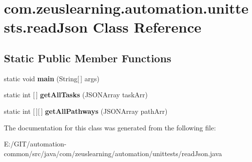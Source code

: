 \hypertarget{classcom_1_1zeuslearning_1_1automation_1_1unittests_1_1readJson}{}\section{com.\+zeuslearning.\+automation.\+unittests.\+read\+Json Class Reference}
\label{classcom_1_1zeuslearning_1_1automation_1_1unittests_1_1readJson}
\subsection*{Static Public Member Functions}
\begin{DoxyCompactItemize}
\item 
\hypertarget{classcom_1_1zeuslearning_1_1automation_1_1unittests_1_1readJson_a82dd9afad3a59c61f4ccb4925624365a}{}\label{classcom_1_1zeuslearning_1_1automation_1_1unittests_1_1readJson_a82dd9afad3a59c61f4ccb4925624365a} 
static void {\bfseries main} (String\mbox{[}$\,$\mbox{]} args)
\item 
\hypertarget{classcom_1_1zeuslearning_1_1automation_1_1unittests_1_1readJson_a9858029d871c4755694e663c3dc4d3dd}{}\label{classcom_1_1zeuslearning_1_1automation_1_1unittests_1_1readJson_a9858029d871c4755694e663c3dc4d3dd} 
static int \mbox{[}$\,$\mbox{]} {\bfseries get\+All\+Tasks} (J\+S\+O\+N\+Array task\+Arr)
\item 
\hypertarget{classcom_1_1zeuslearning_1_1automation_1_1unittests_1_1readJson_ad1f026f7840b6e63397feb4b46f879ed}{}\label{classcom_1_1zeuslearning_1_1automation_1_1unittests_1_1readJson_ad1f026f7840b6e63397feb4b46f879ed} 
static int \mbox{[}$\,$\mbox{]}\mbox{[}$\,$\mbox{]} {\bfseries get\+All\+Pathways} (J\+S\+O\+N\+Array path\+Arr)
\end{DoxyCompactItemize}


The documentation for this class was generated from the following file\+:\begin{DoxyCompactItemize}
\item 
E\+:/\+G\+I\+T/automation-\/common/src/java/com/zeuslearning/automation/unittests/read\+Json.\+java\end{DoxyCompactItemize}
